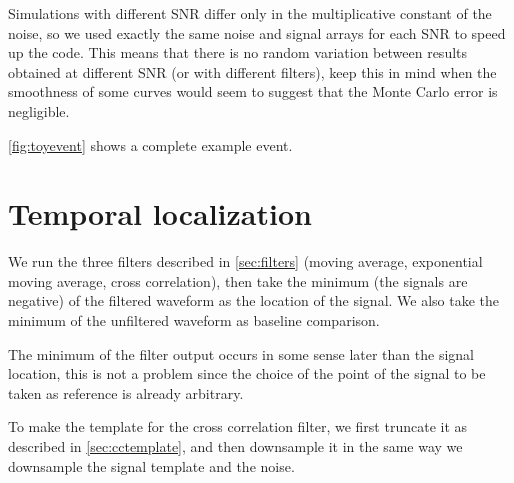 Simulations with different SNR differ only in the multiplicative constant of
the noise, so we used exactly the same noise and signal arrays for each SNR to
speed up the code. This means that there is no random variation between results
obtained at different SNR (or with different filters), keep this in mind when
the smoothness of some curves would seem to suggest that the Monte Carlo error
is negligible.

\autoref{fig:toyevent} shows a complete example event.

\begin{figure}
    
    

\end{figure}

\section{Temporal localization}

We run the three filters described in \autoref{sec:filters} (moving
average, exponential moving average, cross correlation), then take the minimum
(the signals are negative) of the filtered waveform as the location of the
signal. We also take the minimum of the unfiltered waveform as baseline
comparison.

The minimum of the filter output occurs in some sense later than the signal
location, this is not a problem since the choice of the point of the signal to
be taken as reference is already arbitrary.

To make the template for the cross correlation filter, we first truncate it
as described in \autoref{sec:cctemplate}, and then downsample it in the same
way we downsample the signal template and the noise.

\begin{figure}
    
    

\end{figure}

